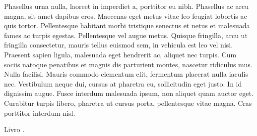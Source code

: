 \documentclass[qual, classic, a4paper]{ufbathesis}
\begin{document}
Phasellus urna nulla, laoreet in imperdiet a, porttitor eu nibh. Phasellus ac arcu magna, sit amet dapibus eros. Maecenas eget metus vitae leo feugiat lobortis ac quis tortor. Pellentesque habitant morbi tristique senectus et netus et malesuada fames ac turpis egestas. Pellentesque vel augue metus. Quisque fringilla, arcu ut fringilla consectetur, mauris tellus euismod sem, in vehicula est leo vel nisi. Praesent sapien ligula, malesuada eget hendrerit ac, aliquet nec turpis. Cum sociis natoque penatibus et magnis dis parturient montes, nascetur ridiculus mus. Nulla facilisi. Mauris commodo elementum elit, fermentum placerat nulla iaculis nec. Vestibulum neque dui, cursus at pharetra eu, sollicitudin eget justo. In id dignissim augue. Fusce interdum malesuada ipsum, non aliquet quam auctor eget. Curabitur turpis libero, pharetra ut cursus porta, pellentesque vitae magna. Cras porttitor interdum nisl.

Livro \cite{raymond1999}.


\backmatter

\appendix

% 
% 
% 






\end{document}
